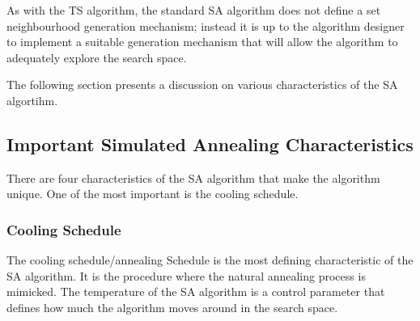 As with the \gls{TS} algorithm, the standard \gls{SA} algorithm does not define a set neighbourhood generation mechanism; instead it is up to the algorithm designer to implement a suitable generation mechanism that will allow the algorithm to adequately explore the search space\cite{VariousCoolingSA}. 

The following section presents a discussion on various characteristics of the \gls{SA} algortihm.
\subsection{Important Simulated Annealing Characteristics}
There are four characteristics of the \gls{SA} algorithm that make the algorithm unique. One of the most important is the cooling schedule. 


\subsubsection{Cooling Schedule}
The cooling schedule/annealing Schedule is the most defining characteristic of the \gls{SA} algorithm. It is the procedure where the natural annealing process is mimicked. The temperature of the \gls{SA} algorithm is a control parameter that defines how much the algorithm moves around in the search space.

